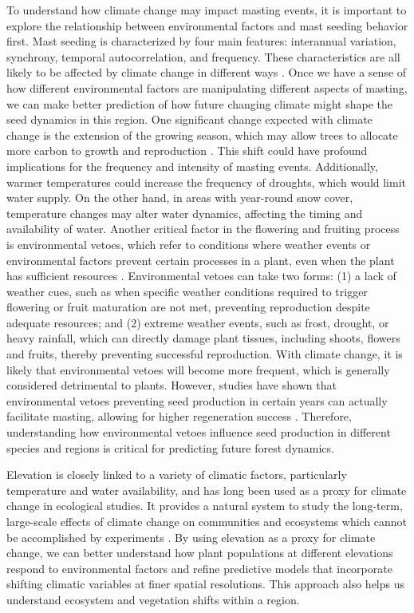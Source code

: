 \documentclass[11pt,letter]{article}
\begin{document}
To understand how climate change may impact masting events, it is important to explore the relationship between environmental factors and mast seeding behavior first. Mast seeding is characterized by four main features: interannual variation, synchrony, temporal autocorrelation, and frequency. These characteristics are all likely to be affected by climate change in different ways \citep{hacket2021climate}. Once we have a sense of how different environmental factors are manipulating different aspects of masting, we can make better prediction of how future changing climate might shape the seed dynamics in this region. One significant change expected with climate change is the extension of the growing season, which may allow trees to allocate more carbon to growth and reproduction \citep{keenan2014net}. This shift could have profound implications for the frequency and intensity of masting events. Additionally, warmer temperatures could increase the frequency of droughts, which would limit water supply. On the other hand, in areas with year-round snow cover, temperature changes may alter water dynamics, affecting the timing and availability of water. Another critical factor in the flowering and fruiting process is environmental vetoes, which refer to conditions where weather events or environmental factors prevent certain processes in a plant, even when the plant has sufficient resources \citep{bogdziewicz2022will} . Environmental vetoes can take two forms: (1) a lack of weather cues, such as when specific weather conditions required to trigger flowering or fruit maturation are not met, preventing reproduction despite adequate resources; and (2) extreme weather events, such as frost, drought, or heavy rainfall, which can directly damage plant tissues, including shoots, flowers and fruits, thereby preventing successful reproduction. With climate change, it is likely that environmental vetoes will become more frequent, which is generally considered detrimental to plants. However, studies have shown that environmental vetoes preventing seed production in certain years can actually facilitate masting, allowing for higher regeneration success \citep{bogdziewicz2018correlated, bogdziewicz2019environmental}. Therefore, understanding how environmental vetoes influence seed production in different species and regions is critical for predicting future forest dynamics.\par
Elevation is closely linked to a variety of climatic factors, particularly temperature and water availability, and has long been used as a proxy for climate change in ecological studies. It provides a natural system to study the long-term, large-scale effects of climate change on communities and ecosystems which cannot be accomplished by experiments \citep{sundqvist2013community}. By using elevation as a proxy for climate change, we can better understand how plant populations at different elevations respond to environmental factors and refine predictive models that incorporate shifting climatic variables at finer spatial resolutions. This approach also helps us understand ecosystem and vegetation shifts within a region.\par
\end{document}
